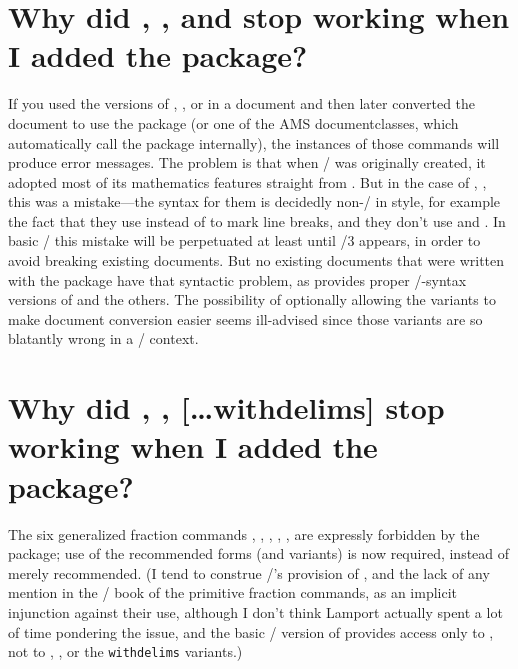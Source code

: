 \documentclass{amsdtx}
\begin{document}
\section{Why did , , and  stop working
when I added the  package?}

If you used the  versions of , , or
 in a document and then later converted the document to use the
 package (or one of the AMS documentclasses, which
automatically call the  package internally), the instances
of those commands will produce error messages. The problem
is that when \latex/ was originally created, it adopted most of its
mathematics features straight from . But in the case of
, ,  this was a mistake---the 
syntax for them is decidedly non-\latex/ in style, for example the fact
that they use  instead of \cn{\\} to mark line breaks, and they
don't use  and . In basic \latex/ this mistake will be
perpetuated at least until \latex/3 appears, in order to avoid breaking
existing documents. But no existing documents that were written with the
 package have that syntactic problem, as 
provides proper \latex/-syntax versions of  and the others.
The possibility of optionally allowing the  variants to
make document conversion easier seems ill-advised since those variants
are so blatantly wrong in a \latex/ context.

\section{Why did , ,  [\dots{\ntt withdelims}]
 stop working when I added the  package?}

The six generalized fraction commands , ,
, , ,  are
expressly forbidden by the  package; use of the recommended
forms  (and variants) is now required, instead of merely
recommended. (I tend to construe \latex/'s provision of , and
the lack of any mention in the \latex/ book of the primitive fraction
commands, as an implicit injunction against their use, although I don't
think Lamport actually spent a lot of time pondering the issue, and the
basic \latex/ version of  provides access only to ,
not to , , or the \verb'withdelims' variants.)
\end{document}

